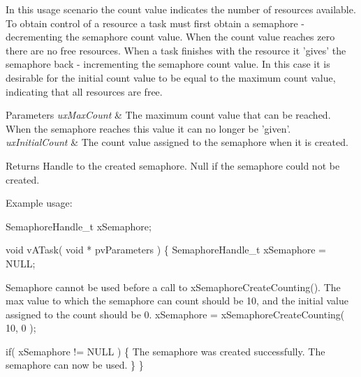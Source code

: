 In this usage scenario the count value indicates the number of resources available. To obtain control of a resource a task must first obtain a semaphore -\/ decrementing the semaphore count value. When the count value reaches zero there are no free resources. When a task finishes with the resource it 'gives' the semaphore back -\/ incrementing the semaphore count value. In this case it is desirable for the initial count value to be equal to the maximum count value, indicating that all resources are free.


\begin{DoxyParams}{Parameters}
{\em ux\-Max\-Count} & The maximum count value that can be reached. When the semaphore reaches this value it can no longer be 'given'.\\
\hline
{\em ux\-Initial\-Count} & The count value assigned to the semaphore when it is created.\\
\hline
\end{DoxyParams}
\begin{DoxyReturn}{Returns}
Handle to the created semaphore. Null if the semaphore could not be created.
\end{DoxyReturn}
Example usage\-: 
\begin{DoxyPre}
 SemaphoreHandle\_t xSemaphore;\end{DoxyPre}



\begin{DoxyPre} void vATask( void * pvParameters )
 \{
 SemaphoreHandle\_t xSemaphore = NULL;\end{DoxyPre}



\begin{DoxyPre}Semaphore cannot be used before a call to xSemaphoreCreateCounting().
The max value to which the semaphore can count should be 10, and the
initial value assigned to the count should be 0.
    xSemaphore = xSemaphoreCreateCounting( 10, 0 );\end{DoxyPre}



\begin{DoxyPre}    if( xSemaphore != NULL )
    \{
The semaphore was created successfully.
The semaphore can now be used.
    \}
 \}
 \end{DoxyPre}
 